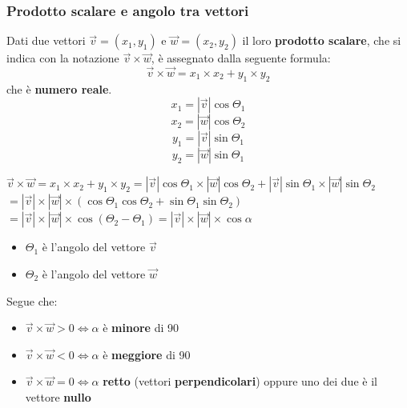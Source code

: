 \documentclass{article}
\begin{document}
\subsubsection{Prodotto scalare e angolo tra vettori}

Dati due vettori $\overrightarrow{v}=(x_1, y_1)$ e $\overrightarrow{w}=(x_2,y_2)$ il loro \textbf{prodotto scalare}, che si indica con la notazione $\overrightarrow{v}\times\overrightarrow{w}$, è assegnato dalla seguente formula:
\begin{equation*}
  \overrightarrow{v}\times\overrightarrow{w}= x_1 \times x_2 + y_1 \times y_2 
\end{equation*} che è \textbf{numero reale}.
\begin{equation*}
  x_1=|\overrightarrow{v}|\cos\Theta_1
\end{equation*}
\begin{equation*}
  x_2=|\overrightarrow{w}|\cos\Theta_2
\end{equation*}
\begin{equation*}
  y_1=|\overrightarrow{v}|\sin\Theta_1
\end{equation*}
\begin{equation*}
  y_2=|\overrightarrow{w}|\sin\Theta_1
\end{equation*}


$\overrightarrow{v}\times\overrightarrow{w}= x_1 \times x_2 + y_1 \times y_2 = |\overrightarrow{v}|\cos\Theta_1 \times |\overrightarrow{w}|\cos\Theta_2+|\overrightarrow{v}|\sin\Theta_1 \times |\overrightarrow{w}|\sin\Theta_2$\\
$=|\overrightarrow{v}|\times|\overrightarrow{w}|\times(\cos\Theta_1\cos\Theta_2+\sin\Theta_1\sin\Theta_2)$\\
$=|\overrightarrow{v}|\times|\overrightarrow{w}|\times\cos(\Theta_2-\Theta_1) = |\overrightarrow{v}|\times|\overrightarrow{w}| \times\cos\alpha$\\
\begin{itemize}
  \item $\Theta_1$ è l'angolo del vettore $\overrightarrow{v}$
  \item $\Theta_2$ è l'angolo del vettore $\overrightarrow{w}$
\end{itemize}
Segue che:
\begin{itemize}
  \item $\overrightarrow{v}\times\overrightarrow{w}> 0\iff \alpha$ è \textbf{minore} di 90
  \item $\overrightarrow{v}\times\overrightarrow{w}< 0\iff \alpha$ è \textbf{meggiore} di 90
  \item $\overrightarrow{v}\times\overrightarrow{w}= 0\iff \alpha$ \textbf{retto} (vettori \textbf{perpendicolari}) oppure uno dei due è il vettore \textbf{nullo}
\end{itemize}
 
\end{document}

